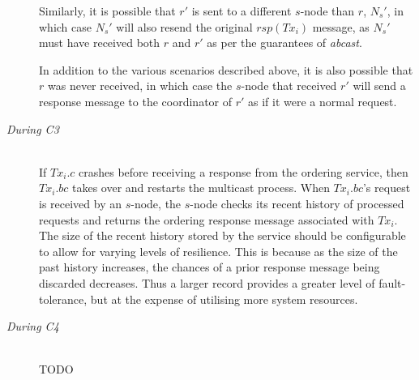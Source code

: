 \begin{description}
        Similarly, it is possible that $r'$ is sent to a different $s$-node than $r$, $N_s'$, in which case $N_s'$ will also resend the original $rsp(Tx_i)$ message, as $N_s'$ must have received both $r$ and $r'$ as per the guarantees of \emph{abcast}.  
        
        In addition to the various scenarios described above, it is also possible that $r$ was never received, in which case the $s$-node that received $r'$ will send a response message to the coordinator of $r'$ as if it were a normal request.  
        
        \item[\emph{During C3}]  \hfill \\
        If $Tx_i.c$ crashes before receiving a response from the ordering service, then $Tx_i.bc$ takes over and restarts the multicast process.  When $Tx_i.bc$'s request is received by an $s$-node, the $s$-node checks its recent history of processed requests and returns the ordering response message associated with $Tx_i$.  The size of the recent history stored by the service should be configurable to allow for varying levels of resilience.   This is because as the size of the past history increases, the chances of a prior response message being discarded decreases.  Thus a larger record provides a greater level of fault-tolerance, but at the expense of utilising more system resources.  
        
        \item[\emph{During C4}]  \hfill \\
                TODO
                
    \end{description}
    
